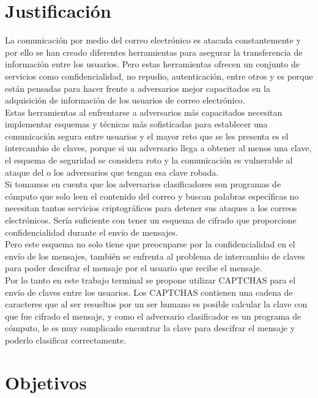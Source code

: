 \documentclass[12pt,oneside,onecolumn,openany]{report}
\begin{document}
\section{Justificación}
La comunicación por medio del correo electrónico es atacada constantemente y por ello se han creado diferentes herramientas para asegurar la transferencia de información entre los usuarios. Pero estas herramientas ofrecen un conjunto de servicios como confidencialidad, no repudio, autenticación, entre otros y es porque están pensadas para hacer frente a adversarios mejor capacitados en la adquisición de información de los usuarios de correo electrónico.\\
Estas herramientas al enfrentarse a adversarios más capacitados necesitan implementar esquemas y técnicas más sofisticadas para establecer una comunicación segura entre usuarios y el mayor reto que se les presenta es el intercambio de claves, porque si un adversario llega a obtener al menos una clave, el esquema de seguridad se considera roto y la comunicación es vulnerable al ataque del o los adversarios que tengan esa clave robada.\\
 Si tomamos en cuenta que los adversarios clasificadores son programas de cómputo que solo leen el contenido del correo y buscan palabras específicas no necesitan tantos servicios criptográficos para detener sus ataques a los correos electrónicos. Sería suficiente con tener un esquema de cifrado que proporcione confidencialidad durante el envío de mensajes.\\
Pero este esquema no solo tiene que preocuparse por la confidencialidad en el envío de los mensajes, también se enfrenta al problema de intercambio de claves para poder descifrar el mensaje por el usuario que recibe el mensaje.\\
Por lo tanto en este trabajo terminal se propone utilizar CAPTCHAS para el envío de claves entre los usuarios. Los CAPTCHAS contienen una cadena de caracteres que al ser resueltos por un ser humano es posible calcular la clave con que fue cifrado el mensaje, y como el adversario clasificador es un programa de cómputo, le es muy complicado encontrar la clave para descifrar el mensaje y poderlo clasificar correctamente.\\

\section{Objetivos} %
\end{document}
